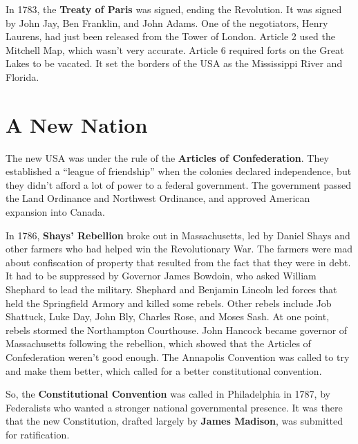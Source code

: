 In 1783, the \textbf{Treaty of Paris} was signed, ending the Revolution.
It was signed by John Jay, Ben Franklin, and John Adams.
One of the negotiators, Henry Laurens, had just been released from the Tower of London.
Article 2 used the Mitchell Map, which wasn't very accurate.
Article 6 required forts on the Great Lakes to be vacated.
It set the borders of the USA as the Mississippi River and Florida.

\section{A New Nation}

The new USA was under the rule of the \textbf{Articles of Confederation}.
They established a ``league of friendship'' when the colonies declared independence,
but they didn't afford a lot of power to a federal government.
The government passed the Land Ordinance and Northwest Ordinance,
and approved American expansion into Canada.

In 1786, \textbf{Shays' Rebellion} broke out in Massachusetts,
led by Daniel Shays and other farmers who had helped win the Revolutionary War.
The farmers were mad about confiscation of property that resulted from the fact that they were in debt.
It had to be suppressed by Governor James Bowdoin, who asked William Shephard to lead the military.
Shephard and Benjamin Lincoln led forces that held the Springfield Armory and killed some rebels.
Other rebels include Job Shattuck, Luke Day, John Bly, Charles Rose, and Moses Sash.
At one point, rebels stormed the Northampton Courthouse.
John Hancock became governor of Massachusetts following the rebellion,
which showed that the Articles of Confederation weren't good enough.
The Annapolis Convention was called to try and make them better,
which called for a better constitutional convention.

So, the \textbf{Constitutional Convention} was called in Philadelphia in 1787,
by Federalists who wanted a stronger national governmental presence.
It was there that the new Constitution, drafted largely by \textbf{James Madison},
was submitted for ratification.
